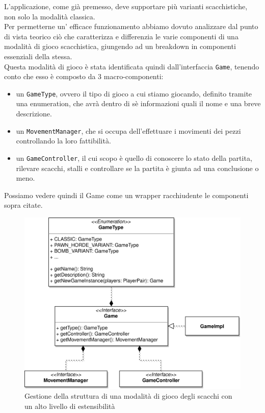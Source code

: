 \documentclass[a4paper,12pt]{report}
\begin{document}
L'applicazione, come già premesso, deve supportare più varianti scacchistiche, non solo la modalità classica.\\
Per permetterne un' efficace funzionamento abbiamo dovuto analizzare dal punto di vista teorico ciò che caratterizza e differenzia le varie componenti di una modalità di gioco scacchistica, giungendo ad un breakdown in componenti essenziali della stessa.
\\
Questa modalità di gioco è stata identificata quindi dall'interfaccia \texttt{Game}, tenendo conto che esso è composto da 3 macro-componenti:
\begin{itemize}
	\item un \texttt{GameType}, ovvero il tipo di gioco a cui stiamo giocando, definito tramite una enumeration, che avrà dentro di sè informazioni quali il nome e una breve descrizione.
	\item un \texttt{MovementManager}, che si occupa dell'effettuare i movimenti dei pezzi controllando la loro fattibilità.
	\item un \texttt{GameController}, il cui scopo è quello di conoscere lo stato della partita, rilevare scacchi, stalli e controllare se la partita è giunta ad una conclusione o meno.
\end{itemize}
Possiamo vedere quindi il Game come un wrapper racchiudente le componenti sopra citate.
\
%
\begin{figure}[H]
    \begin{center}
        \centering
        \includegraphics[width=\textwidth]{img/Alessandro/game_management.png}
    \end{center}
    \caption{Gestione della struttura di una modalità di gioco degli scacchi con un alto livello di estensibilità}
    \label{img:game_management}
\end{figure}
\end{document}
